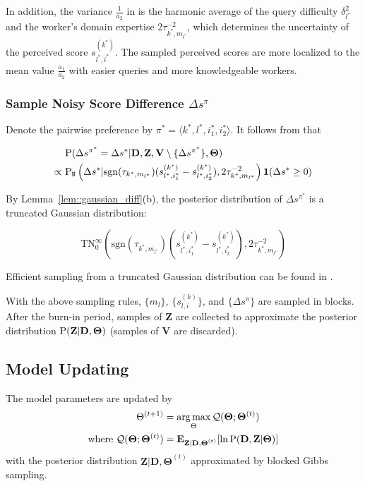 In addition, the variance $\frac{1}{a_2}$ in  is the harmonic
average of the query difficulty  $\delta^2_{l^*}$ and the worker's domain
expertise $2\tau_{k^*,m_{l^*}}^{-2}$, which determines the uncertainty of the
perceived score $s_{l^*,i^*}^{(k^*)}$. The sampled perceived scores are more
localized to the mean value $\frac{a_1}{a_2}$ with easier queries and more
knowledgeable workers.

\subsubsection{Sample Noisy Score Difference $\Delta s^\pi$} Denote the pairwise
preference by $\pi^* = \langle k^*, l^*,i_1^*,i_2^* \rangle$. It follows from
 that

\begin{align}
& \P( \Delta s^{\pi^*} = \Delta s^* | \mathbf{D}, \mathbf{Z},
    \mathbf{V}\setminus \{\Delta s^{\pi^*} \}, \mathbf{\Theta})
    \label{eq::tpp_ds}\\
\propto~ &  \P_{\mathtt{N}}\left( \Delta s^* | \mathrm{sgn}(\tau_{k^*,m_{l^*}})
      ( s_{l^*,i_1^*}^{(k^*)} - s_{l^*,i_2^*}^{(k^*)}),
      2\tau_{k^*,m_{l^*}}^{-2}\right)  \mathbf{1}(\Delta s^* \geq 0 ) \nonumber
\end{align}

By Lemma~\ref{lem::gaussian_diff}(b), the posterior distribution of $\Delta
s^{\pi^*}$ is a truncated Gaussian distribution:

\[
  \mathrm{TN}_0^\infty\left(\mathrm{sgn}(\tau_{k^*,m_{l^*}})
    (s_{l^*,i_1^*}^{(k^*)} - s_{l^*,i_2^*}^{(k^*)}),
    2\tau_{k^*,m_{l^*}}^{-2}\right)
\]

Efficient sampling from a truncated Gaussian distribution can be found in
\cite{chopin2011fast}.

With the above sampling rules, $\{m_l\}$, $\{s_{l,i}^{(k)}\}$, and $\{\Delta
s^\pi\}$ are sampled in blocks. After the burn-in period, samples of
$\mathbf{Z}$ are collected to approximate the posterior distribution
$\P(\mathbf{Z | D, \Theta})$ (samples of $\mathbf{V}$ are discarded).


\subsection{Model Updating}
The model parameters are updated by
\begin{align}
\Theta^{(t+1)} &=
  \argmax_\Theta \mathcal{Q}(\mathbf{\Theta}; \mathbf{\Theta}^{(t)}) \nonumber\\
\textrm{where}~
\mathcal{Q}(\mathbf{\Theta}; \mathbf{\Theta}^{(t)}) &=
  \E_{\mathbf{Z | D,\Theta}^{(t)}}[\ln \P(\mathbf{D,Z | \Theta})]
  \label{eq::tpp_elbo}
\end{align}
with the posterior distribution $\mathbf{Z | D,\Theta}^{(t)}$ approximated by blocked Gibbs sampling.

